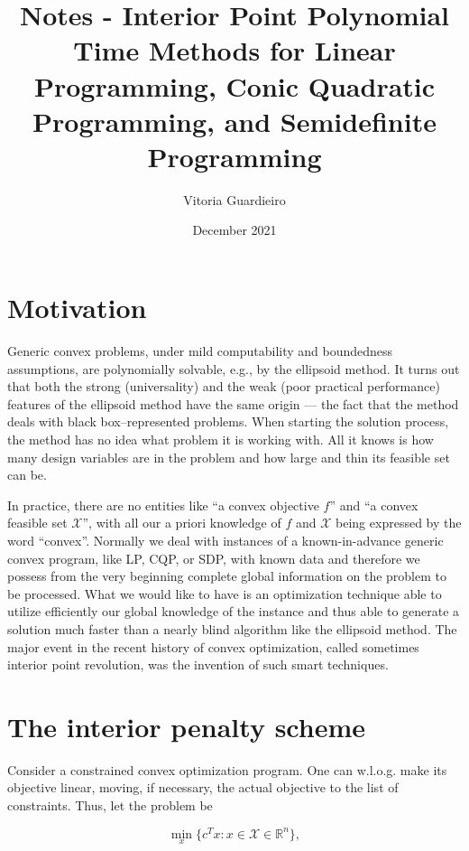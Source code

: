 \documentclass[11pt,a4paper]{article}
\title{Notes - Interior Point Polynomial Time Methods for Linear Programming, Conic Quadratic Programming, and Semidefinite Programming}
\author{Vitoria Guardieiro}
\date{December 2021}
\newcommand{\X}{\mathcal{X}}
\newcommand{\R}{\mathbb{R}}
\begin{document}
\maketitle

\tableofcontents

\section{Motivation}

Generic convex problems, under mild computability and boundedness assumptions, are polynomially solvable, e.g., by the ellipsoid method. It turns out that both the strong (universality) and the weak (poor practical performance) features of the ellipsoid method have the same origin — the fact that the method deals with black box–represented problems. When starting the solution process, the method has no idea what problem it is working with. All it knows is how many design variables are in the problem and how large and thin its feasible set can be.

In practice, there are no entities like “a convex objective $f$” and “a convex feasible set $\X$”, with all our a priori knowledge of $f$ and $\X$ being expressed by the word “convex”. Normally we deal with instances of a known-in-advance generic convex program, like LP, CQP, or SDP, with known data and therefore we possess from the very beginning complete global information on the problem to be processed. What we would like to have is an optimization technique able to utilize efficiently our global knowledge of the instance and thus able to generate a solution much faster than a nearly blind algorithm like the ellipsoid method. The major event in the recent history of convex optimization, called sometimes interior point revolution, was the invention of such smart techniques.

\section{The interior penalty scheme}

Consider a constrained convex optimization program. One can w.l.o.g. make its objective linear, moving, if necessary, the actual objective to the list of constraints. Thus, let the problem be

\begin{equation}\label{eq:c}
    \underset{x}{\min} \{c^T x : x \in \mathcal{X} \in \R ^n\},\tag{C}
\end{equation}
\end{document}
